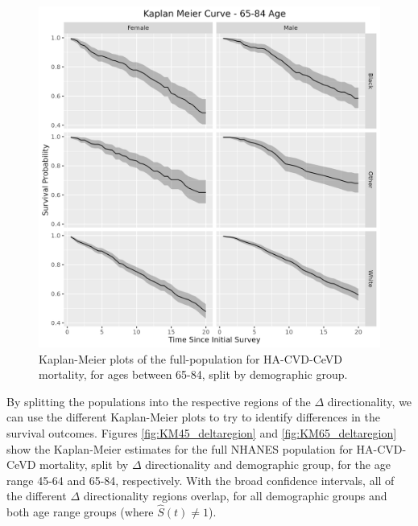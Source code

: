 \documentclass[
]{article}
\begin{document}
\begin{figure}
\hypertarget{fig:KM65tot}{%
\centering
\includegraphics{./Rmarkdown_Plots/SurvProbKM_65-84.png}
\caption{Kaplan-Meier plots of the full-population for HA-CVD-CeVD mortality, for ages between 65-84, split by demographic group.}\label{fig:KM65tot}
}
\end{figure}

By splitting the populations into the respective regions of the \(\Delta\) directionality, we can use the different Kaplan-Meier plots to try to identify differences in the survival outcomes. Figures \ref{fig:KM45_deltaregion} and \ref{fig:KM65_deltaregion} show the Kaplan-Meier estimates for the full NHANES population for HA-CVD-CeVD mortality, split by \(\Delta\) directionality and demographic group, for the age range 45-64 and 65-84, respectively. With the broad confidence intervals, all of the different \(\Delta\) directionality regions overlap, for all demographic groups and both age range groups (where \(\hat{S}(t)\neq 1\)).
\end{document}

